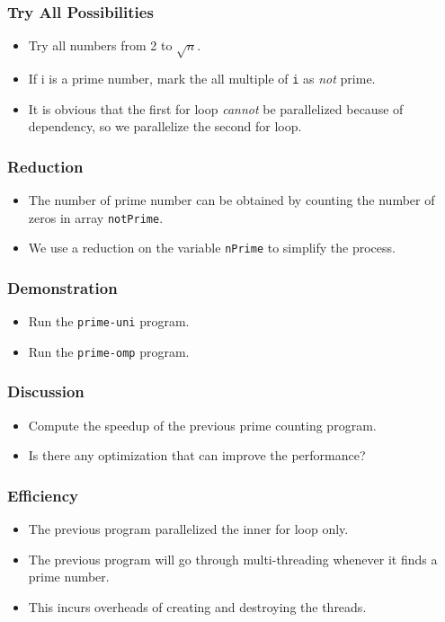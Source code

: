 \documentclass{beamer}
\begin{document}
\begin{frame}
\frametitle{Try All Possibilities}
\begin{itemize}
\item Try all numbers from 2 to $\sqrt{n}$.
\item If i is a prime number, mark the all multiple of {\tt i} as {\em
  not} prime.
\item It is obvious that the first for loop {\em cannot} be
  parallelized because of dependency, so we parallelize the second for
  loop.
\end{itemize}
\end{frame}

\begin{frame}
\frametitle{Reduction}
\begin{itemize}
\item The number of prime number can be obtained by counting the
  number of zeros in array {\tt notPrime}.
\item We use a reduction on the variable {\tt nPrime} to simplify the
  process.
\end{itemize}
\end{frame}

\begin{frame}
  \frametitle{Demonstration}
  \begin{itemize}
  \item Run the {\tt prime-uni} program.
  \item Run the {\tt prime-omp} program.
  \end{itemize}
\end{frame}

\begin{frame}
  \frametitle{Discussion}
  \begin{itemize}
  \item Compute the speedup of the previous prime counting program.
  \item Is there any optimization that can improve the performance?
  \end{itemize}
\end{frame}

\begin{frame}
\frametitle{Efficiency}
\begin{itemize}
\item The previous program parallelized the inner for loop only.
\item The previous program will go through multi-threading whenever it finds a prime number.
\item This incurs overheads of creating and destroying the threads.
\end{itemize}
\end{frame}
\end{document}
